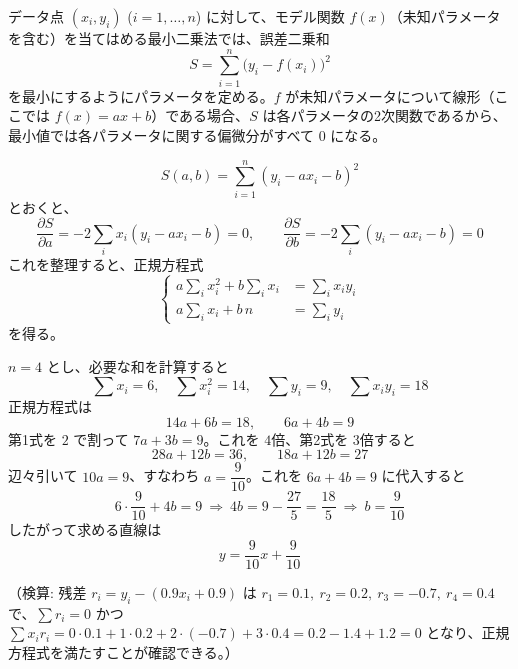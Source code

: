 
データ点 $(x_i, y_i)$ ($i=1,\dots,n$) に対して、モデル関数 $f(x)$（未知パラメータを含む）を当てはめる最小二乗法では、誤差二乗和
\[
S = \sum_{i=1}^{n} \bigl(y_i - f(x_i)\bigr)^2
\]
を最小にするようにパラメータを定める。$f$ が未知パラメータについて線形（ここでは $f(x) = ax + b$）である場合、$S$ は各パラメータの2次関数であるから、最小値では各パラメータに関する偏微分がすべて $0$ になる。

\[
S(a,b) = \sum_{i=1}^n (y_i - ax_i - b)^2
\]
とおくと、
\[
\frac{\partial S}{\partial a} = -2\sum_i x_i(y_i - ax_i - b) = 0, \qquad
\frac{\partial S}{\partial b} = -2\sum_i (y_i - ax_i - b) = 0
\]
これを整理すると、正規方程式
\[
\left\{
\begin{aligned}
a\sum_i x_i^2 + b \sum_i x_i &= \sum_i x_i y_i \\
a\sum_i x_i + b\, n &= \sum_i y_i
\end{aligned}
\right.
\]
を得る。

$n=4$ とし、必要な和を計算すると
\[
\sum x_i = 6,\quad \sum x_i^2 = 14,\quad \sum y_i = 9,\quad \sum x_i y_i = 18
\]
正規方程式は
\[
14a + 6b = 18, \qquad 6a + 4b = 9
\]
第1式を $2$ で割って $7a+3b=9$。これを $4$倍、第2式を $3$倍すると
\[
28a+12b=36, \qquad 18a+12b=27
\]
辺々引いて $10a = 9$、すなわち $a = \dfrac{9}{10}$。これを $6a+4b=9$ に代入すると
\[
6\cdot\frac{9}{10} + 4b = 9 \ \Longrightarrow\ 4b = 9 - \frac{27}{5} = \frac{18}{5} \ \Longrightarrow\ b = \frac{9}{10}
\]
したがって求める直線は
\[
\boxed{\; y = \frac{9}{10}x + \frac{9}{10} \;}
\]

（検算: 残差 $r_i = y_i - (0.9x_i+0.9)$ は $r_1=0.1,\ r_2=0.2,\ r_3=-0.7,\ r_4=0.4$ で、$\sum r_i = 0$ かつ $\sum x_i r_i = 0\cdot0.1+1\cdot0.2+2\cdot(-0.7)+3\cdot0.4=0.2-1.4+1.2=0$ となり、正規方程式を満たすことが確認できる。）
